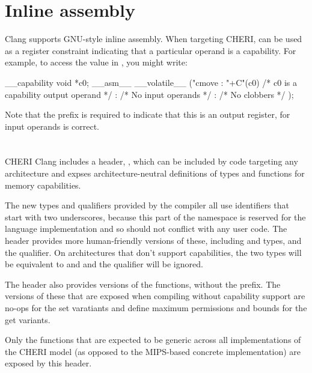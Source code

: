\section{Inline assembly}

Clang supports GNU-style inline assembly.
When targeting CHERI,  can be used as a register constraint indicating that a particular operand is a capability.
For example, to access the value in , you might write:

\begin{csnippet}
__capability void *c0;
__asm__ __volatile__ ("cmove %
	: "+C"(c0) /* c0 is a capability output operand */
	: /* No input operands */
	: /* No clobbers */
	);
\end{csnippet}

Note that the \ccode{+} prefix is required to indicate that this is an output register, for input operands  is correct.

\section{}

CHERI Clang includes a header, , which can be included by code targeting any architecture and expses architecture-neutral definitions of types and functions for memory capabilities.

The new types and qualifiers provided by the compiler all use identifiers that start with two underscores, because this part of the namespace is reserved for the language implementation and so should not conflict with any user code.
The  header provides more human-friendly versions of these, including  and  types, and the  qualifier.
On architectures that don't support capabilities, the two types will be equivalent to  and  and the qualifier will be ignored.

The header also provides versions of the  functions, without the  prefix.
The versions of these that are exposed when compiling without capability support are no-ops for the set varatiants and define maximum permissions and bounds for the get variants.

Only the functions that are expected to be generic across all implementations of the CHERI model (as opposed to the MIPS-based concrete implementation) are exposed by this header.

